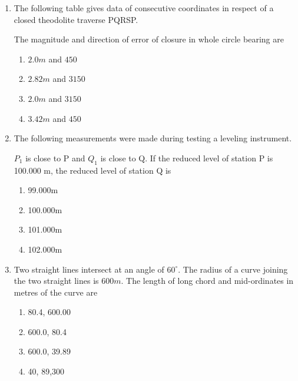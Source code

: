 \documentclass[journal]{IEEEtran}
\begin{document}
\begin{enumerate}
{        }
        \item{
        	
        	The following table gives data of consecutive coordinates in respect of a closed theodolite traverse PQRSP.
        	
        	
        	
        	The magnitude and direction of error of closure in whole circle bearing are
        	
        	\hfill
        	
        	\begin{multicols}{4}
        		\begin{enumerate}
        			\item $2.0m$ and $450$
        			\item $2.82m$ and $3150$
        			\item $2.0m$ and $3150$
        			\item $3.42m$ and $450$
        		\end{enumerate}
        	\end{multicols}
        	
        }
            \item{
        	
        	The following measurements were made during testing a leveling instrument.
        	
        	
        	
        	\(P_1\) is close to P and \(Q_1\) is close to Q. If the reduced level of station P is 100.000 m, the reduced level of station Q is
        	
        	\hfill
        	
        	\begin{multicols}{4}
        		\begin{enumerate}
        			\item 99.000m
        			\item 100.000m
        			\item 101.000m
        			\item 102.000m
        		\end{enumerate}
        	\end{multicols}
        	
        }    
        \item{
        
        Two straight lines intersect at an angle of $60^\circ$. The radius of a curve joining the two straight lines is $600m$. The length of long chord and mid-ordinates in metres of the curve are
        \hfill
        
        \begin{multicols}{4}
        	\begin{enumerate}
        		\item 80.4, 600.00
        		\item 600.0, 80.4
        		\item 600.0, 39.89
        		\item 40, 89,300
        	\end{enumerate}
        \end{multicols}
        
        }
    \end{enumerate}
\end{document}
